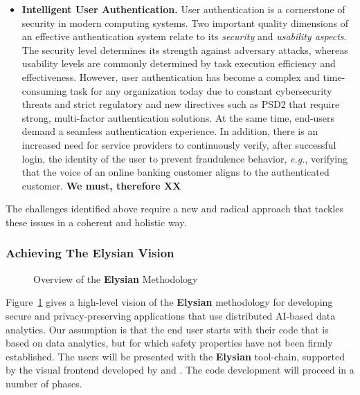 \documentclass[a4paper,11pt]{article}
\newcommand{\project}[1]{\textbf{#1}\xspace}
\newcommand{\SECURITY}{\project{Elysian}}
\newcommand{\TheProject}{\SECURITY}
\begin{document}
\begin{itemize}
\item \textbf{Intelligent User Authentication.} 
User authentication is a cornerstone of security in modern computing systems. Two important quality dimensions of an effective authentication system relate to its \textit{security} and \textit{usability aspects}. The security level determines its strength against adversary attacks, whereas usability levels are commonly determined by task execution efficiency and effectiveness. However, user authentication has become a complex and time-consuming task for any organization today due to constant cybersecurity threats and strict regulatory and new directives such as PSD2 that require strong, multi-factor authentication solutions. At the same time, end-users demand a seamless authentication experience. In addition, there is an increased need for service providers to continuously verify, after successful login, the identity of the user to prevent fraudulence behavior, \textit{e.g.}, verifying that the voice of an online banking customer aligns to the authenticated customer. \textbf{We must, therefore XX}



\end{itemize}


The challenges identified above require a new and radical
approach that tackles these issues in a coherent and
holistic way. 

\subsubsection{Achieving The \TheProject{} Vision}

\begin{figure}[tph!]
  \begin{center}
  \vspace{-5mm}
  \caption{Overview of the \TheProject{} Methodology}
  \label{fig:overview}
  \end{center}
  \end{figure}

Figure~\ref{fig:overview} gives a high-level vision of the \TheProject{} methodology for developing secure and privacy-preserving applications that use distributed AI-based data analytics. Our assumption is that the end user starts with their code that is based on data analytics, but for which safety properties have not been firmly established. The users will be presented with the \TheProject{} tool-chain, supported by the visual frontend developed by \USTANshort{} and \YAGshort{}. The code development will proceed in a number of phases.
\end{document}
